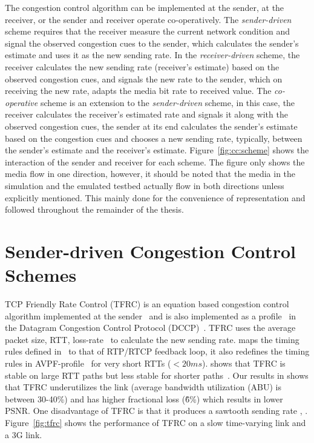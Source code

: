 The congestion control algorithm can be implemented at the sender, at the
receiver, or the sender and receiver operate co-operatively. The
\emph{sender-driven} scheme requires that the receiver measure the current
network condition and signal the observed congestion cues to the sender, which
calculates the sender's estimate and uses it as the new sending rate. In the
\emph{receiver-driven} scheme, the receiver calculates the new sending rate
(receiver's estimate) based on the observed congestion cues, and signals the
new rate to the sender, which on receiving the new rate, adapts the media bit
rate to received value. The \emph{co-operative} scheme is an extension to the
\emph{sender-driven} scheme, in this case, the receiver calculates the
receiver's estimated rate and signals it along with the observed congestion
cues, the sender at its end calculates the sender's estimate based on the
congestion cues and chooses a new sending rate, typically, between the
sender's estimate and the receiver's estimate. Figure~\ref{fig:cc:scheme}
shows the interaction of the sender and receiver for each scheme. The figure
only shows the media flow in one direction, however, it should be noted that
the media in the simulation and the emulated testbed actually flow in both
directions unless explicitly mentioned. This mainly done for the convenience
of representation and followed throughout the remainder of the thesis.



\section{Sender-driven Congestion Control Schemes}

TCP Friendly Rate Control (TFRC) is an equation based congestion control
algorithm implemented at the sender~\cite{tfrc_347397} and is also implemented
as a profile~\cite{rfc4342} in the Datagram Congestion Control Protocol
(DCCP)~\cite{rfc4340}. TFRC uses the average packet size, RTT,
loss-rate~\cite{rfc3448} to calculate the new sending rate.
\cite{draft.rtp.tfrc} maps the timing rules defined in~\cite{rfc4828, rfc5348}
to that of RTP/RTCP feedback loop, it also redefines the timing rules in
AVPF-profile~\cite{rfc4585} for very short RTTs ($<20ms$).
\cite{Gharai06:ICME} shows that TFRC is stable on large RTT paths but less
stable for shorter paths~\cite{saurin:2006:thesis}. Our results in
 shows that TFRC underutilizes the link (average bandwidth
utilization (ABU) is between 30-40\%) and has higher fractional loss (\~6\%)
which results in lower PSNR. One disadvantage of TFRC is that it produces a
sawtooth sending rate \cite{saurin:2006:thesis}, .
Figure~\ref{fig:tfrc} shows the performance of TFRC on a slow time-varying
link and a 3G link.

